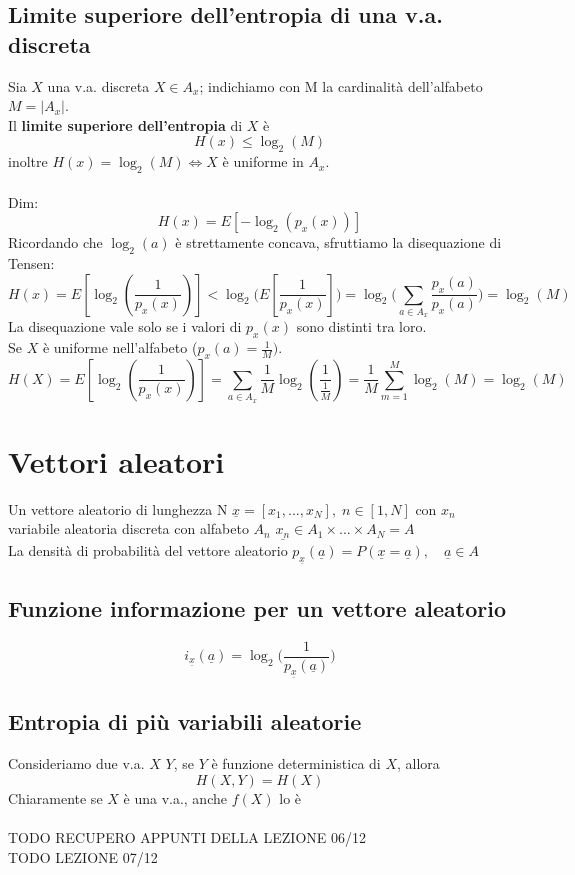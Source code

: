 \documentclass{article}
\begin{document}
\subsection{Limite superiore dell'entropia di una v.a. discreta}
Sia $X$ una v.a. discreta $X\in A_x$; indichiamo con M la cardinalità dell'alfabeto $M=|A_x|$.\\
Il \textbf{limite superiore dell'entropia} di $X$ è
$$H(x)\leq \log_2(M)$$
inoltre $H(x)=\log_2(M)\iff X$ è uniforme in $A_x$.\\\\
Dim:
$$H(x)=E[-\log_2(p_x(x))]$$
Ricordando che $\log_2(a)$ è strettamente concava, sfruttiamo la disequazione di Tensen:
$$H(x)=E[\log_2(\frac{1}{p_x(x)})]<\log_2\biggl(E[\frac{1}{p_x(x)}]\biggl)=\log_2\biggl(\sum_{a\in A_x}\frac{p_x(a)}{p_x(a)}\biggl)=\log_2(M)$$
La disequazione vale solo se i valori di $p_x(x)$ sono distinti tra loro.\\
Se $X$ è uniforme nell'alfabeto ($p_x(a)=\frac{1}{M}).$
$$H(X)=E[\log_2(\frac{1}{p_x(x)})]=\sum_{a\in A_x}\frac{1}{M}\log_2(\frac{1}{\frac{1}{M}})=\frac{1}{M}\sum_{m=1}^M\log_2(M)=\log_2(M)$$

\newpage
\section{Vettori aleatori}
Un vettore aleatorio di lunghezza N $\underline{x}=[x_1,...,x_N],\; n\in[1,N]$ con $x_n$ variabile aleatoria discreta con alfabeto $A_n$ $\underline{x_n}\in A_1\times ...\times A_N=A$\\
La densità di probabilità del vettore aleatorio $p_{\underline{x}}(\underline{a})=P(\underline{x}=\underline{a}),\quad \underline{a}\in A$

\subsection{Funzione informazione per un vettore aleatorio}
$$i_{\underline{x}}(\underline{a})=\log_2\Big(\frac{1}{p_{\underline{x}}(\underline{a})}\Big)$$

\subsection{Entropia di più variabili aleatorie}
Consideriamo due v.a. $X$ $Y$, se $Y$ è funzione deterministica di $X$, allora
$$H(X, Y)=H(X)$$
Chiaramente se $X$ è una v.a., anche $f(X)$ lo è\\\\
TODO RECUPERO APPUNTI DELLA LEZIONE 06/12\\
TODO LEZIONE 07/12
\end{document}
